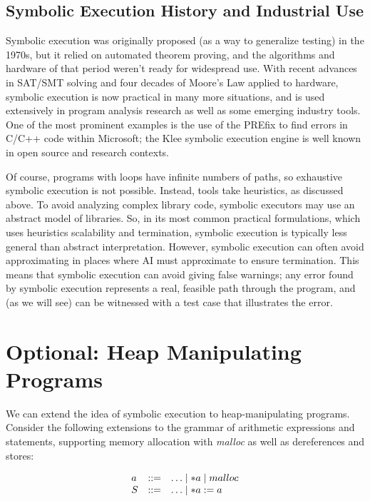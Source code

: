 \documentclass[11pt]{article}
\begin{document}
\subsection{Symbolic Execution History and Industrial Use}

Symbolic execution was originally proposed (as a way to generalize testing) in
the 1970s, but it relied on automated theorem proving, and the algorithms and
hardware of that period weren't ready for widespread use. With recent advances
in SAT/SMT solving and four decades of Moore's Law applied to hardware, symbolic
execution is now practical in many more situations, and is used extensively in
program analysis research as well as some emerging industry tools. One of the
most prominent examples is the use of the PREfix to find errors in
C/C++ code within Microsoft; the Klee symbolic execution engine is well known in
open source and research contexts.

Of course, programs with loops have infinite numbers of paths, so exhaustive
symbolic execution is not possible. Instead, tools take heuristics, as discussed
above. To avoid analyzing complex library code, symbolic executors may use an
abstract model of libraries. So, in its most common practical formulations,
which uses heuristics scalability and termination, symbolic execution is
typically less general than abstract interpretation. However, symbolic execution
can often avoid approximating in places where AI must approximate to ensure
termination. This means that symbolic execution can avoid giving false warnings;
any error found by symbolic execution represents a real, feasible path through
the program, and (as we will see) can be witnessed with a test case that
illustrates the error.

\section{Optional: Heap Manipulating Programs}

We can extend the idea of symbolic execution to heap-manipulating programs.
Consider the following extensions to the grammar of arithmetic expressions and
statements, supporting memory allocation with \textit{malloc} as well as
dereferences and stores:

\[
\begin{array}{lll}
a & ::= & \ldots \mathrel{\mid} *a \mathrel{\mid} malloc \\
S & ::= & \ldots \mathrel{\mid} *a := a \\
\end{array}
\]
\end{document}
